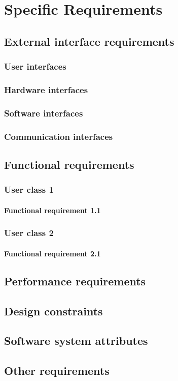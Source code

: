 \chapter{Specific Requirements}

\section{External interface requirements}
\subsection{User interfaces}
\subsection{Hardware interfaces}
\subsection{Software interfaces}
\subsection{Communication interfaces}

\section{Functional requirements}
\subsection{User class 1}
\subsubsection{Functional requirement 1.1}
\subsection{User class 2}
\subsubsection{Functional requirement 2.1}

\section{Performance requirements}
\section{Design constraints}
\section{Software system attributes}
\section{Other requirements}